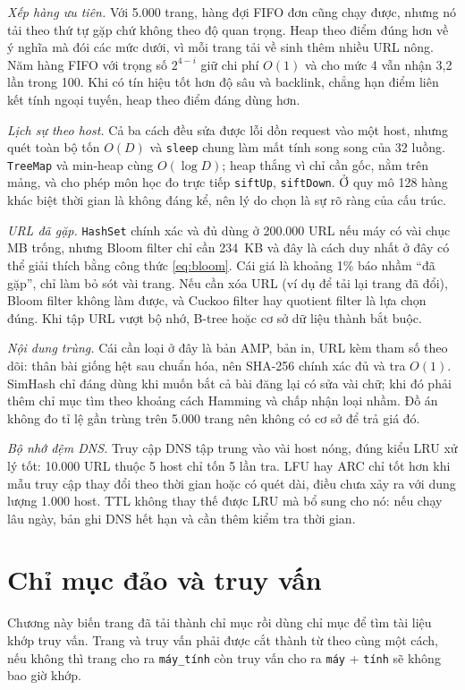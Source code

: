 \documentclass[9pt,twocolumn,a4paper]{extarticle}
\newcommand{\code}[1]{\texttt{#1}}
\begin{document}
\textit{Xếp hàng ưu tiên.} Với 5.000 trang, hàng đợi FIFO đơn cũng chạy được, nhưng nó tải theo thứ tự gặp chứ không theo độ quan trọng. Heap theo điểm đúng hơn về ý nghĩa mà đói các mức dưới, vì mỗi trang tải về sinh thêm nhiều URL nông. Năm hàng FIFO với trọng số $2^{4-i}$ giữ chi phí $O(1)$ và cho mức 4 vẫn nhận 3,2 lần trong 100. Khi có tín hiệu tốt hơn độ sâu và backlink, chẳng hạn điểm liên kết tính ngoại tuyến, heap theo điểm đáng dùng hơn.

\textit{Lịch sự theo host.} Cả ba cách đều sửa được lỗi dồn request vào một host, nhưng quét toàn bộ tốn $O(D)$ và \code{sleep} chung làm mất tính song song của 32 luồng. \code{TreeMap} và min-heap cùng $O(\log D)$; heap thắng vì chỉ cần gốc, nằm trên mảng, và cho phép môn học đo trực tiếp \code{siftUp}, \code{siftDown}. Ở quy mô 128 hàng khác biệt thời gian là không đáng kể, nên lý do chọn là sự rõ ràng của cấu trúc.

\textit{URL đã gặp.} \code{HashSet} chính xác và đủ dùng ở 200.000 URL nếu máy có vài chục MB trống, nhưng Bloom filter chỉ cần 234~KB và đây là cách duy nhất ở đây có thể giải thích bằng công thức \eqref{eq:bloom}. Cái giá là khoảng 1\% báo nhầm ``đã gặp'', chỉ làm bỏ sót vài trang. Nếu cần xóa URL (ví dụ để tải lại trang đã đổi), Bloom filter không làm được, và Cuckoo filter hay quotient filter là lựa chọn đúng. Khi tập URL vượt bộ nhớ, B-tree hoặc cơ sở dữ liệu thành bắt buộc.

\textit{Nội dung trùng.} Cái cần loại ở đây là bản AMP, bản in, URL kèm tham số theo dõi: thân bài giống hệt sau chuẩn hóa, nên SHA-256 chính xác đủ và tra $O(1)$. SimHash chỉ đáng dùng khi muốn bắt cả bài đăng lại có sửa vài chữ; khi đó phải thêm chỉ mục tìm theo khoảng cách Hamming và chấp nhận loại nhầm. Đồ án không đo tỉ lệ gần trùng trên 5.000 trang nên không có cơ sở để trả giá đó.

\textit{Bộ nhớ đệm DNS.} Truy cập DNS tập trung vào vài host nóng, đúng kiểu LRU xử lý tốt: 10.000 URL thuộc 5 host chỉ tốn 5 lần tra. LFU hay ARC chỉ tốt hơn khi mẫu truy cập thay đổi theo thời gian hoặc có quét dài, điều chưa xảy ra với dung lượng 1.000 host. TTL không thay thế được LRU mà bổ sung cho nó: nếu chạy lâu ngày, bản ghi DNS hết hạn và cần thêm kiểm tra thời gian.
\section{Chỉ mục đảo và truy vấn}
\label{sec:index}
Chương này biến trang đã tải thành chỉ mục rồi dùng chỉ mục để tìm tài liệu khớp truy vấn. Trang và truy vấn phải được cắt thành từ theo cùng một cách, nếu không thì trang cho ra \code{máy\_tính} còn truy vấn cho ra \code{máy} + \code{tính} sẽ không bao giờ khớp.
\end{document}
